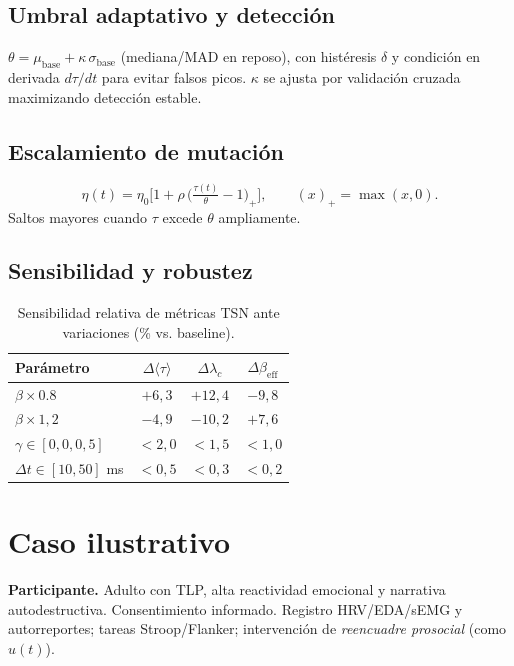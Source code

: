 \documentclass[10pt,a4paper,twocolumn]{article}
\theoremstyle{definition}
\theoremstyle{plain}
\begin{document}
\subsection{Umbral adaptativo y detección}
\(\theta = \mu_{\mathrm{base}} + \kappa\,\sigma_{\mathrm{base}}\) (mediana/MAD en reposo), con histéresis \(\delta\) y condición en derivada \(d\tau/dt\) para evitar falsos picos. \(\kappa\) se ajusta por validación cruzada maximizando detección estable.

\subsection{Escalamiento de mutación}
\begin{equation}
\eta(t) = \eta_0 \Big[1 + \rho\,\big(\tfrac{\tau(t)}{\theta}-1\big)_+\Big],\qquad (x)_+=\max(x,0).
\label{eq:eta_adaptativo}
\end{equation}
Saltos mayores cuando \(\tau\) excede \(\theta\) ampliamente.

\subsection{Sensibilidad y robustez}
\begin{table}[H]\centering\small
\caption{Sensibilidad relativa de métricas TSN ante variaciones (\% vs. baseline).}
\label{tab:sensibilidad}
\begin{tabular}{@{}lccc@{}}
\toprule
\textbf{Parámetro} & $\Delta \langle\tau\rangle$ & $\Delta \lambda_c$ & $\Delta \beta_{\mathrm{eff}}$ \\ \midrule
$\beta \times 0.8$ & $+6,3$ & $+12,4$ & $-9,8$ \\
$\beta \times 1,2$ & $-4,9$ & $-10,2$ & $+7,6$ \\
$\gamma \in [0{,}0, 0{,}5]$ & $<2{,}0$ & $<1{,}5$ & $<1{,}0$ \\
$\Delta t \in [10,50]$ ms & $<0{,}5$ & $<0{,}3$ & $<0{,}2$ \\ \bottomrule
\end{tabular}
\end{table}

\section{Caso ilustrativo}
\textbf{Participante.} Adulto con TLP, alta reactividad emocional y narrativa autodestructiva. Consentimiento informado. Registro HRV/EDA/sEMG y autorreportes; tareas Stroop/Flanker; intervención de \emph{reencuadre prosocial} (como \(u(t)\)).
\end{document}
